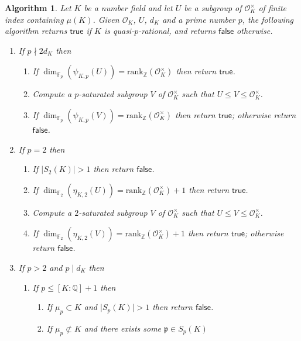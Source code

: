 \documentclass[12pt, a4paper, usenames]{amsart}
\newcommand{\Z}{\mathbb{Z}}
\newcommand{\Q}{\mathbb{Q}}
\theoremstyle{plain}
\newtheorem{algorithm}[theorem]{Algorithm}
\theoremstyle{remark}
\theoremstyle{definition}
\newcommand{\rank}{\mathrm{rank}}
\begin{document}
\begin{algorithm}\label{alg:quasi-p-rat}
Let $K$ be a number field and let $U$ be a subgroup of
$\mathcal{O}_{K}^{\times}$ of finite index containing $\mu(K)$.
Given $\mathcal{O}_{K}$, $U$, $d_{K}$
and a prime number $p$, the following algorithm returns 
\ensuremath{\mathsf{true}} if $K$ is quasi-$p$-rational, 
and returns \ensuremath{\mathsf{false}} otherwise. 
\renewcommand{\labelenumi}{(\arabic{enumi})}
\begin{enumerate}
\item If $p \nmid 2d_{K}$ then 
\begin{enumerate}
    \item If $\dim_{\mathbb{F}_{p}}(\psi_{K,p}(U)) = \rank_{\Z}(\mathcal{O}_{K}^{\times})$ then return \ensuremath{\mathsf{true}}.
    \item Compute a $p$-saturated subgroup $V$ of $\mathcal{O}_{K}^{\times}$ 
such that $U \leq V \leq \mathcal{O}_{K}^{\times}$.
    \item If $\dim_{\mathbb{F}_{p}}(\psi_{K,p}(V)) = \rank_{\Z}(\mathcal{O}_{K}^{\times})$ then return \ensuremath{\mathsf{true}};
    otherwise return \ensuremath{\mathsf{false}}.
\end{enumerate}
\item If $p=2$ then 
\begin{enumerate}
    \item If $\lvert S_{2}(K) \rvert >1$ then return \ensuremath{\mathsf{false}}.
    \item If
    $\dim_{\mathbb{F}_{2}}(\eta_{K,2}(U)) = \rank_{\Z}(\mathcal{O}_{K}^{\times})+1$ then return \ensuremath{\mathsf{true}}.
    \item Compute a $2$-saturated subgroup $V$ of $\mathcal{O}_{K}^{\times}$ 
such that $U \leq V \leq \mathcal{O}_{K}^{\times}$.
    \item If $\dim_{\mathbb{F}_{2}}(\eta_{K,2}(V)) = \rank_{\Z}(\mathcal{O}_{K}^{\times})+1$ 
    then return \ensuremath{\mathsf{true}}; otherwise return \ensuremath{\mathsf{false}}.
\end{enumerate}
\item If $p>2$ and $p \mid d_{K}$ then 
\begin{enumerate}
    \item If $p \leq [K:\Q]+1$ then 
    \begin{enumerate}
    \item If $\mu_{p} \subset K$ and $\lvert S_{p}(K) \rvert >1$
    then return \ensuremath{\mathsf{false}}.
    \item If $\mu_{p} \not \subset K$ and there exists some $\mathfrak{p} \in S_{p}(K)$ 

\end{enumerate}
\end{enumerate}
\end{enumerate}
\end{algorithm}
\end{document}
